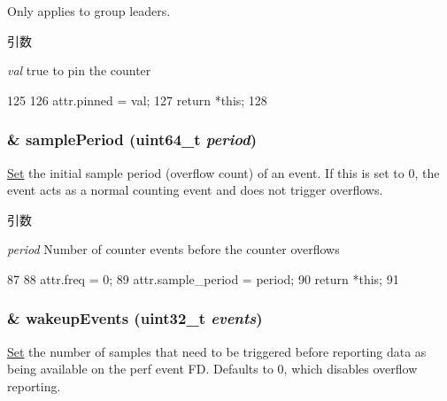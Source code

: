 Only applies to group leaders.


\begin{DoxyParams}{引数}
\item[{\em val}]true to pin the counter \end{DoxyParams}



\begin{DoxyCode}
125                                            {
126         attr.pinned = val;
127         return *this;
128     }
\end{DoxyCode}
\hypertarget{classPerfKvmCounterConfig_a21da8ec8646ef482a43c9912690f12db}{
\subsubsection[{samplePeriod}]{\& samplePeriod (uint64\_\-t {\em period})}}
\label{classPerfKvmCounterConfig_a21da8ec8646ef482a43c9912690f12db}
\hyperlink{classSet}{Set} the initial sample period (overflow count) of an event. If this is set to 0, the event acts as a normal counting event and does not trigger overflows.


\begin{DoxyParams}{引数}
\item[{\em period}]Number of counter events before the counter overflows \end{DoxyParams}



\begin{DoxyCode}
87                                                         {
88         attr.freq = 0;
89         attr.sample_period = period;
90         return *this;
91     }
\end{DoxyCode}
\hypertarget{classPerfKvmCounterConfig_a52dc4277819e416e01e710c3fcd0741f}{
\subsubsection[{wakeupEvents}]{\& wakeupEvents ({\bf uint32\_\-t} {\em events})}}
\label{classPerfKvmCounterConfig_a52dc4277819e416e01e710c3fcd0741f}
\hyperlink{classSet}{Set} the number of samples that need to be triggered before reporting data as being available on the perf event FD. Defaults to 0, which disables overflow reporting.


